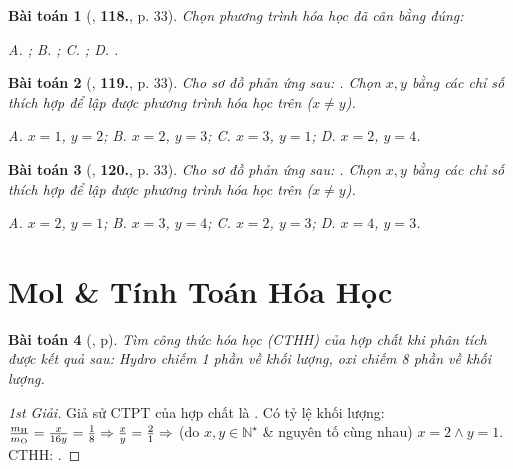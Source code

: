 \documentclass{article}
\numberwithin{equation}{section}
\newtheorem{baitoan}{Bài toán}
\begin{document}
\begin{baitoan}[\cite{An2011}, \textbf{118.}, p. 33]
	Chọn phương trình hóa học đã cân bằng đúng:
	
		{\sf A.} \emph{};
		{\sf B.} \emph{};
		{\sf C.} \emph{};
		{\sf D.} \emph{}.
	
\end{baitoan}

\begin{baitoan}[\cite{An2011}, \textbf{119.}, p. 33]
	Cho sơ đồ phản ứng sau: \emph{}. Chọn $x,y$ bằng các chỉ số thích hợp để lập được phương trình hóa học trên ($x\ne y$).
	
		{\sf A.} $x = 1$, $y = 2$;
		{\sf B.} $x = 2$, $y = 3$;
		{\sf C.} $x = 3$, $y = 1$;
		{\sf D.} $x = 2$, $y = 4$.
	
\end{baitoan}

\begin{baitoan}[\cite{An2011}, \textbf{120.}, p. 33]
	Cho sơ đồ phản ứng sau: \emph{}. Chọn $x,y$ bằng các chỉ số thích hợp để lập được phương trình hóa học trên ($x\ne y$).
	
		{\sf A.} $x = 2$, $y = 1$;
		{\sf B.} $x = 3$, $y = 4$;
		{\sf C.} $x = 2$, $y = 3$;
		{\sf D.} $x = 4$, $y = 3$.
	
\end{baitoan}


\section{Mol \& Tính Toán Hóa Học}

\begin{baitoan}[\cite{An_400_BT_Hoa_Hoc_8_2020}, p]
	Tìm công thức hóa học (CTHH) của hợp chất khi phân tích được kết quả sau: Hydro chiếm 1 phần về khối lượng, oxi chiếm 8 phần về khối lượng.
\end{baitoan}

\begin{proof}[1st Giải]
	Giả sử CTPT của hợp chất là . Có tỷ lệ khối lượng: $\frac{m_{\rm H}}{m_{\rm O}} = \frac{x}{16y} = \frac{1}{8}\Rightarrow\frac{x}{y} = \frac{2}{1}\Rightarrow$ (do $x,y\in\mathbb{N}^\star$ \& nguyên tố cùng nhau) $x = 2\land y = 1$. CTHH: .
\end{proof}
\end{document}
